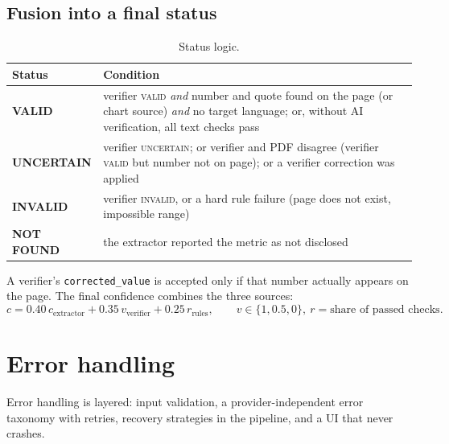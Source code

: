 \documentclass[11pt,a4paper]{article}
\newcommand{\code}[1]{\texttt{\small #1}}
\begin{document}
\subsection{Fusion into a final status}
\begin{table}[H]
\centering\small
\begin{tabularx}{\linewidth}{@{}lX@{}}
\toprule
\textbf{Status} & \textbf{Condition}\\\midrule
\textcolor{esggreen}{\textbf{VALID}} & verifier \textsc{valid} \emph{and} number and quote found on the page (or chart source) \emph{and} no target language; or, without AI verification, all text checks pass\\
\textcolor{esgamber}{\textbf{UNCERTAIN}} & verifier \textsc{uncertain}; or verifier and PDF disagree (verifier \textsc{valid} but number not on page); or a verifier correction was applied\\
\textcolor{esgred}{\textbf{INVALID}} & verifier \textsc{invalid}, or a hard rule failure (page does not exist, impossible range)\\
\textbf{NOT FOUND} & the extractor reported the metric as not disclosed\\
\bottomrule
\end{tabularx}
\caption{Status logic.}
\end{table}
A verifier's \code{corrected\_value} is accepted only if that number actually appears on the page.
The final confidence combines the three sources:
\begin{equation}
c = 0.40\,c_\text{extractor} + 0.35\,v_\text{verifier} + 0.25\,r_\text{rules},\qquad v\in\{1, 0.5, 0\},\ r=\text{share of passed checks}.
\end{equation}

\section{Error handling}\label{sec:errors}
Error handling is layered: input validation, a provider-independent error taxonomy with retries, recovery
strategies in the pipeline, and a UI that never crashes.
\end{document}
